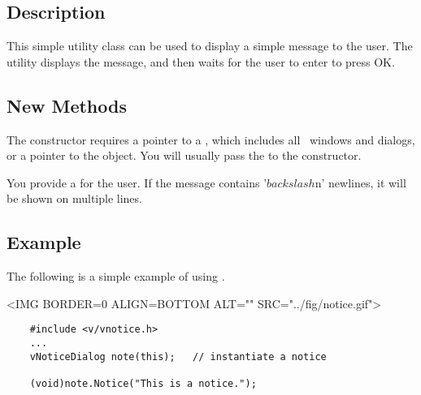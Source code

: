 \subsection* {Description}

This simple utility class can be used to display a simple
message to the user. The utility displays the message, and then
waits for the user to enter to press OK.

\subsection* {New Methods}


The  constructor requires a pointer to a
, which includes all \V\ windows and dialogs,
or a pointer to the  object.
You will usually pass the  to the constructor.


You provide a  for the user. If the message
contains '$backslash$n' newlines, it will be shown on multiple
lines.

\subsection*{Example}

The following is a simple example of using .

\vspace{.1in}

\small
\begin{rawhtml}
<IMG BORDER=0 ALIGN=BOTTOM ALT="" SRC="../fig/notice.gif">
\end{rawhtml}
\begin{latexonly}

\end{latexonly}
\normalfont\normalsize

\footnotesize
\begin{verbatim}
    #include <v/vnotice.h>
    ...
    vNoticeDialog note(this);   // instantiate a notice

    (void)note.Notice("This is a notice.");
\end{verbatim}
\normalfont\normalsize

